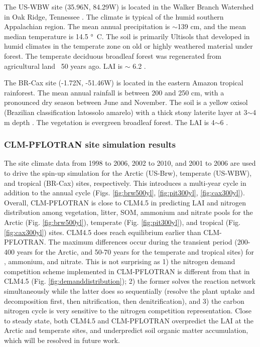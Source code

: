 \documentclass[gmd, manuscript]{copernicus}
\begin{document}
The US-WBW site (35.96N, 84.29W) is located in the Walker Branch Watershed in
Oak Ridge, Tennessee \citep{Hanson2003}. The climate is typical of the humid
southern Appalachian region. The mean annual precipitation is $\sim$139 cm, and
the mean median temperature is 14.5 \unit{\degree C}.  
The soil is primarily Ultisols that developed in humid climates in the
temperate zone on old or highly weathered material under forest. The temperate
deciduous broadleaf forest was regenerated from agricultural land ~50 years ago.
LAI is $\sim$ 6.2 \citep{Hanson2004}.

The BR-Cax site (-1.72N, -51.46W) is located in the eastern Amazon tropical
rainforest. The mean annual rainfall is between 200 and 250 \unit{cm}, with a
pronounced dry season between June and November. The soil is a yellow oxisol
(Brazilian classification latossolo amarelo) with a thick stony laterite layer
at 3$\sim$4 m depth \citep{daCosta2010}. The vegetation is evergreen
broadleaf forest. The LAI is 4$\sim$6 \citep{Powell2013}. 

\subsubsection{CLM-PFLOTRAN site simulation results}
The site climate data from 1998 to 2006, 2002 to 2010, and 2001 to 2006  are
used to drive the spin-up simulation for the Arctic (US-Brw), temperate
(US-WBW), and tropical (BR-Cax) sites, respectively. This introduces a
multi-year cycle in addition to the annual cycle (Figs. \ref{fig:brw500yl},
\ref{fig:pit300yl}, \ref{fig:cax300yl}). Overall, CLM-PFLOTRAN is close to
CLM4.5 in predicting LAI and nitrogen distribution among vegetation, litter,
SOM, ammonium and nitrate pools for the Arctic (Fig. \ref{fig:brw500yl}),
temperate (Fig. \ref{fig:pit300yl}), and tropical (Fig. \ref{fig:cax300yl})
sites. CLM4.5 does reach equilibrium earlier than CLM-PFLOTRAN. The maximum
differences occur during the transient period (200-400 years for the Arctic, and 50-70
years for the temperate and tropical sites) for , ammonium, and
nitrate. This is not surprising as 1) the nitrogen demand competition
scheme implemented in CLM-PFLOTRAN is different from that in CLM4.5 (Fig.
\ref{fig:demanddistribution}); 2) the former solves the reaction network
simultaneously while the latter does so sequentially (resolve the plant uptake and
decomposition first, then nitrification, then denitrification), and 3) the
carbon nitrogen cycle is very sensitive to the nitrogen competition
representation. Close to steady state, both CLM4.5 and CLM-PFLOTRAN overpredict the LAI at the
Arctic and temperate sites, and underpredict soil organic matter accumulation, which will
be resolved in future work.
\end{document}
